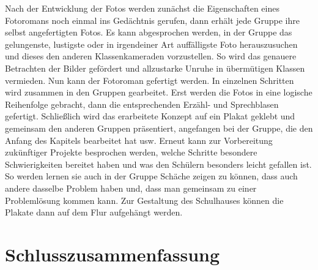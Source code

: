 Nach der Entwicklung der Fotos werden zunächst die Eigenschaften eines Fotoromans noch einmal ins Gedächtnis gerufen, dann erhält jede Gruppe ihre selbst angefertigten Fotos. Es kann abgesprochen werden, in der Gruppe das gelungenste, lustigste oder in irgendeiner Art auffälligste Foto herauszusuchen und dieses den anderen Klassenkameraden vorzustellen. So wird das genauere Betrachten der Bilder gefördert und allzustarke Unruhe in übermütigen Klassen vermieden. Nun kann der Fotoroman gefertigt werden. In einzelnen Schritten wird zusammen in den Gruppen gearbeitet. Erst werden die Fotos in eine logische Reihenfolge gebracht, dann die entsprechenden Erzähl- und Sprechblasen gefertigt. Schließlich wird das erarbeitete Konzept auf ein Plakat geklebt und gemeinsam den anderen Gruppen präsentiert, angefangen bei der Gruppe, die den Anfang des Kapitels bearbeitet hat usw. Erneut kann zur Vorbereitung zukünftiger Projekte besprochen werden, welche Schritte besondere Schwierigkeiten bereitet haben und was den Schülern besonders leicht gefallen ist. So werden lernen sie auch in der Gruppe Schäche zeigen zu können, dass auch andere dasselbe Problem haben und, dass man gemeinsam zu einer Problemlösung kommen kann. Zur Gestaltung des Schulhauses können die Plakate dann auf dem Flur aufgehängt werden.


\chapter{Schlusszusammenfassung}

